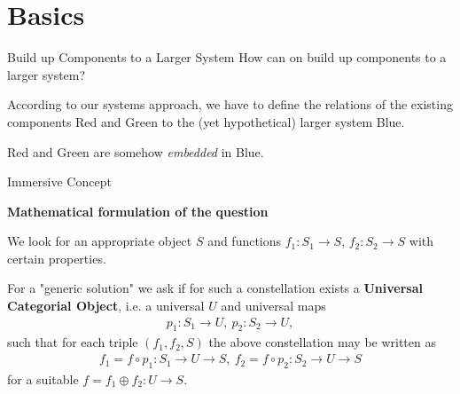 \documentclass{beamer}
\title{Modelling Sustainable Systems\\ and Semantic Web\\[6pt]
  Immersive and Submersive System Theories
  \vskip1em}
\subtitle{Lecture in the Module 10-202-2312\\ for Master Computer Science}
\author{Prof. Dr. Hans-Gert Gräbe\\
\url{http://www.informatik.uni-leipzig.de/~graebe}}
\date{April 2022}
\newcommand{\ueberschrift}[1]{\begin{center}\bf #1\end{center}}
\begin{document}
{
\begin{frame}
  \titlepage
\end{frame}}

\section{Basics}
\begin{frame}{Build up Components to a Larger System}
How can on build up components to a larger system? 

According to our systems approach, we have to define the relations of the
existing components Red and Green to the (yet hypothetical) larger system
Blue. 
\begin{center}  
\end{center}
Red and Green are somehow \emph{embedded} in Blue.

\end{frame}
\begin{frame}{Immersive Concept}

\ueberschrift{Mathematical formulation of the question}
\small

We look for an appropriate object $S$ and functions $f_1: S_1 \rightarrow S$,
$f_2: S_2 \rightarrow S$ with certain properties.

For a "generic solution" we ask if for such a constellation exists a
\textbf{Universal Categorial Object}, i.e. a universal $U$ and universal maps
\begin{gather*}
  p_1: S_1 \rightarrow U,\ p_2: S_2 \rightarrow U,
\end{gather*}
such that for each triple $(f_1, f_2, S)$ the above constellation may be
written as
\begin{gather*}
  f_1 = f \circ p_1: S_1 \rightarrow U \rightarrow S,\ f_2 = f \circ p_2 : S_2
  \rightarrow U \rightarrow S
\end{gather*}
for a suitable $f = f_1 \oplus f_2: U \rightarrow S$.

\end{frame}
\end{document}
